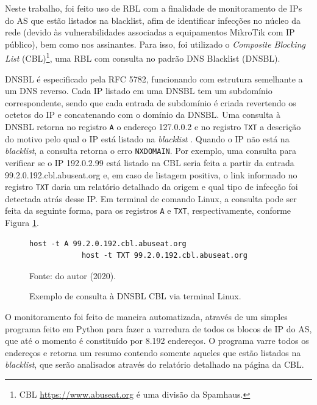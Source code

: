     Neste trabalho, foi feito uso de RBL com a finalidade de monitoramento de IPs do AS que estão listados na blacklist, afim de identificar infecções no núcleo da rede (devido às vulnerabilidades associadas a equipamentos MikroTik com IP público), bem como nos assinantes. Para isso, foi utilizado o \textit{Composite Blocking List} (CBL)\footnote{CBL \url{https://www.abuseat.org} é uma divisão da Spamhaus.}, uma RBL com consulta no padrão DNS Blacklist (DNSBL).
    
    DNSBL é especificado pela RFC 5782, funcionando com estrutura semelhante a um DNS reverso. Cada IP listado em uma DNSBL tem um subdomínio correspondente, sendo que cada entrada de subdomínio é criada revertendo os octetos do IP e concatenando com o domínio da DNSBL. Uma consulta à DNSBL retorna no registro {\tt A} o endereço 127.0.0.2 e no registro {\tt TXT} a descrição do motivo pelo qual o IP está listado na \textit{blacklist} \cite{rfc5782}. Quando o IP não está na \textit{blacklist}, a consulta retorna o erro {\tt NXDOMAIN}. Por exemplo, uma consulta para verificar se o IP 192.0.2.99 está listado na CBL seria feita a partir da entrada 99.2.0.192.cbl.abuseat.org e, em caso de listagem positiva, o link informado no registro {\tt TXT} daria um relatório detalhado da origem e qual tipo de infecção foi detectada atrás desse IP. Em terminal de comando Linux, a consulta pode ser feita da seguinte forma, para os registros {\tt A} e {\tt TXT}, respectivamente, conforme Figura \ref{fig:dnsbl_query}.
    
    \begin{figure}[!htb]
        \centering
        \caption{Exemplo de consulta à DNSBL CBL via terminal Linux.} 
        \label{fig:dnsbl_query}
        
        \begin{Verbatim}[fontsize=\normalsize]
            host -t A 99.2.0.192.cbl.abuseat.org
            host -t TXT 99.2.0.192.cbl.abuseat.org
        \end{Verbatim} 

        {\small Fonte: do autor (2020).} 
    \end{figure}
    
    O monitoramento foi feito de maneira automatizada, através de um simples programa feito em Python para fazer a varredura de todos os blocos de IP do AS, que até o momento é constituído por 8.192 endereços. O programa varre todos os endereços e retorna um resumo contendo somente aqueles que estão listados na \textit{blacklist}, que serão analisados através do relatório detalhado na página da CBL.
    
